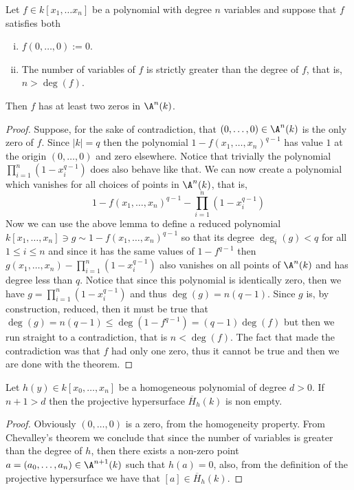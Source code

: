 \begin{theorem}[Chevalley]
   Let \(f \in k[x_1, \dots x_n]\) be a polynomial with degree \(n\) variables
   and suppose that \(f\) satisfies both
   \begin{enumerate}[i.]
      \item \(f(0, \dots, 0) := 0\).
      \item The number of variables of \(f\) is strictly greater than the
         degree of \(f\), that is, \(n > \deg(f)\).
   \end{enumerate}
   Then \(f\) has at least two zeros in \(\A^n(k)\).
\end{theorem}

\begin{proof}
   Suppose, for the sake of contradiction, that \((0, \dots, 0) \in \A^n(k)\) is
   the only zero of \(f\). Since \(|k| = q\) then the polynomial \(1 - f(x_1,
   \dots, x_n)^{q-1}\) has value \(1\) at the origin \((0, \dots, 0)\) and zero
   elsewhere. Notice that trivially the polynomial \(\prod_{i=1}^{n}
   (1-x_i^{q-1})\) does also behave like that. We can now create a polynomial
   which vanishes for all choices of points in \(\A^n(k)\), that is, 
   \[
      1 - f(x_1,\dots,x_n)^{q-1} - \prod_{i=1}^{n} (1 - x_i^{q-1})
   \]
   Now we can use the above lemma to define a reduced polynomial \(k[x_1, \dots,
   x_n] \ni g \sim 1 - f(x_1, \dots, x_n)^{q-1}\) so that its degree \(\deg_i(g)
   < q\) for all \(1 \leqslant i \leqslant n\) and since it has the same values
   of \(1 - f^{q-1}\) then \(g(x_1, \dots, x_n) - \prod_{i=1}^n(1-x_i^{q-1})\)
   also vanishes on all points of \(\A^n(k)\) and has degree less than \(q\).
   Notice that since this polynomial is identically zero, then we have \(g =
   \prod_{i=1}^n (1 - x_i^{q-1})\) and thus \(\deg(g) = n(q-1)\). Since \(g\)
   is, by construction, reduced, then it must be true that \(\deg(g) = n(q-1)
   \leqslant \deg(1 - f^{q-1}) = (q-1)\deg(f)\) but then we run straight to a
   contradiction, that is \(n < \deg(f)\). The fact that made the contradiction
   was that \(f\) had only one zero, thus it cannot be true and then we are done
   with the theorem.
\end{proof}

\begin{corollary}
   Let \(h(y) \in k[x_0, \dots, x_n]\) be a homogeneous polynomial of degree \(d
   > 0\). If \(n + 1 > d\) then the projective hypersurface \(\overline{H}_h(k)\)
   is non empty.
\end{corollary}

\begin{proof}
   Obviously \((0, \dots, 0)\) is a zero, from the homogeneity property. From
   Chevalley's theorem we conclude that since the number of variables is greater
   than the degree of  \(h\), then there exists a non-zero point \(a = (a_0, \dots,
   a_n) \in \A^{n+1}(k)\) such that \(h(a) = 0\), also, from the definition of
   the projective hypersurface we have that \([a]  \in \overline{H}_h(k)\).
\end{proof}
